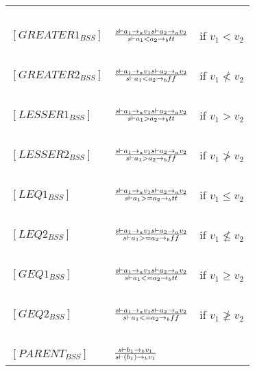 \begin{table}[h]
\begin{tabular}{|l|l|l|}
			~			&															~																			& ~ \\
	$[GREATER1_{BSS}]$	& $s \vdash a_{1} \rightarrow_{a} v_{1}  s \vdash a_{2} \rightarrow_{a} v_{2} \over s \vdash a_{1} < a_{2} \rightarrow_{b} tt$			& if $v_{1} < v_{2}$ \\
			~			&															~																			& ~ \\
	$[GREATER2_{BSS}]$	& $s \vdash a_{1} \rightarrow_{a} v_{1}  s \vdash a_{2} \rightarrow_{a} v_{2} \over s \vdash a_{1} < a_{2} \rightarrow_{b} ff$			& if $v_{1} \not< v_{2}$ \\
			~			&															~																			& ~ \\
	$[LESSER1_{BSS}]$	& $s \vdash a_{1} \rightarrow_{a} v_{1}  s \vdash a_{2} \rightarrow_{a} v_{2} \over s \vdash a_{1} > a_{2} \rightarrow_{b} tt$			& if $v_{1} > v_{2}$ \\
			~			&															~																			& ~ \\
	$[LESSER2_{BSS}]$	& $s \vdash a_{1} \rightarrow_{a} v_{1}  s \vdash a_{2} \rightarrow_{a} v_{2} \over s \vdash a_{1} > a_{2} \rightarrow_{b} ff$			& if $v_{1} \not> v_{2}$ \\
			~			&															~																			& ~ \\
	$[LEQ1_{BSS}]$		& $s \vdash a_{1} \rightarrow_{a} v_{1}  s \vdash a_{2} \rightarrow_{a} v_{2} \over s \vdash a_{1} >= a_{2} \rightarrow_{b} tt$			& if $v_{1} \leq v_{2}$ \\
			~			&															~																			& ~ \\
	$[LEQ2_{BSS}]$		& $s \vdash a_{1} \rightarrow_{a} v_{1}  s \vdash a_{2} \rightarrow_{a} v_{2} \over s \vdash a_{1} >= a_{2} \rightarrow_{b} ff$			& if $v_{1} \not\leq v_{2}$ \\
			~			&															~																			& ~ \\
	$[GEQ1_{BSS}]$		& $s \vdash a_{1} \rightarrow_{a} v_{1}  s \vdash a_{2} \rightarrow_{a} v_{2} \over s \vdash a_{1} <= a_{2} \rightarrow_{b} tt$			& if $v_{1} \geq v_{2}$ \\
			~			&															~																			& ~ \\
	$[GEQ2_{BSS}]$		& $s \vdash a_{1} \rightarrow_{a} v_{1}  s \vdash a_{2} \rightarrow_{a} v_{2} \over s \vdash a_{1} <= a_{2} \rightarrow_{b} ff$			& if $v_{1} \not\geq v_{2}$ \\
			~			&															~																			& ~ \\
	$[PARENT_{BSS}]$	& $s \vdash b_{1} \rightarrow_{b} v_{1} \over s \vdash (b_{1}) \rightarrow_{b} v_{1}$													& ~ \\

\end{tabular}
\end{table}
